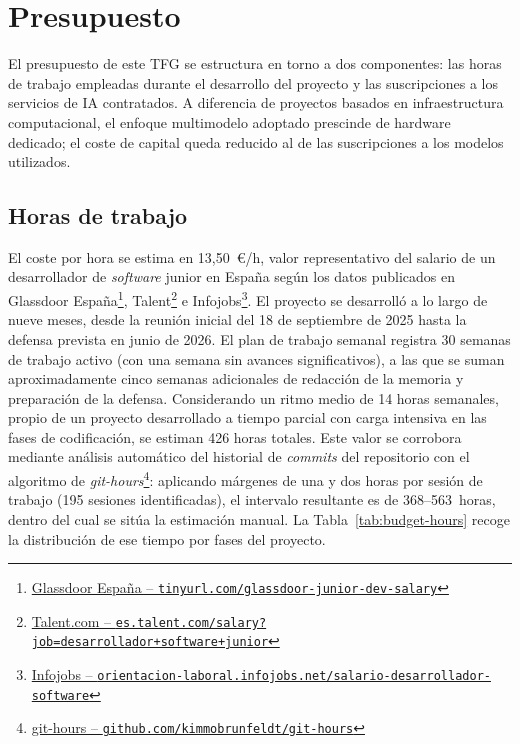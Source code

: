 
\chapter{Presupuesto} \label{chap:Budget}

El presupuesto de este \ac{TFG} se estructura en torno a dos componentes: las horas de trabajo empleadas durante el desarrollo del proyecto y las suscripciones a los servicios de \ac{IA} contratados. A diferencia de proyectos basados en infraestructura computacional, el enfoque multimodelo adoptado prescinde de hardware dedicado; el coste de capital queda reducido al de las suscripciones a los modelos utilizados.

\section{Horas de trabajo} \label{sec:budget-hours}

El coste por hora se estima en 13,50~€/h, valor representativo del salario de un desarrollador de \textit{software} junior en España según los datos publicados en Glassdoor España\footnote{\href{https://www.glassdoor.es/Sueldos/espa\%C3\%B1a-desarrollador-junior-sueldo-SRCH_IL.0,6_IN219_KO7,29.htm}{Glassdoor España -- \texttt{tinyurl.com/glassdoor-junior-dev-salary}}}, Talent\footnote{\href{https://es.talent.com/salary?job=desarrollador+software+junior}{Talent.com -- \texttt{es.talent.com/salary?job=desarrollador+software+junior}}} e Infojobs\footnote{\href{https://orientacion-laboral.infojobs.net/salario-desarrollador-software}{Infojobs -- \texttt{orientacion-laboral.infojobs.net/salario-desarrollador-software}}}. El proyecto se desarrolló a lo largo de nueve meses, desde la reunión inicial del 18 de septiembre de 2025 hasta la defensa prevista en junio de 2026. El plan de trabajo semanal registra 30 semanas de trabajo activo (con una semana sin avances significativos), a las que se suman aproximadamente cinco semanas adicionales de redacción de la memoria y preparación de la defensa. 
Considerando un ritmo medio de 14 horas semanales, propio de un proyecto desarrollado a tiempo parcial con carga intensiva en las fases de codificación, se estiman 426 horas totales.
Este valor se corrobora mediante análisis automático del historial de \textit{commits} del repositorio con el algoritmo de \textit{git-hours}\footnote{\href{https://github.com/kimmobrunfeldt/git-hours}{git-hours -- \texttt{github.com/kimmobrunfeldt/git-hours}}}: aplicando márgenes de una y dos horas por sesión de trabajo (195 sesiones identificadas), el intervalo resultante es de 368--563~horas, dentro del cual se sitúa la estimación manual. La Tabla~\ref{tab:budget-hours} recoge la distribución de ese tiempo por fases del proyecto.

